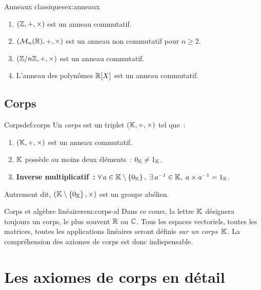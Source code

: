 \begin{example}{Anneaux classiques}{ex:anneaux}
  \begin{enumerate}[label=(\alph*)]
    \item $({\mathbb{Z}},+,\times)$ est un anneau commutatif.
    \item $(\mathcal{M}_n({\mathbb{R}}),+,\times)$ est un anneau non commutatif pour $n\geq 2$.
    \item $({\mathbb{Z}}/n{\mathbb{Z}},+,\times)$ est un anneau commutatif.
    \item L'anneau des polynômes ${\mathbb{R}}[X]$ est un anneau commutatif.
  \end{enumerate}
\end{example}

\subsection{Corps}\label{subsec:corps}

\begin{definition}{Corps}{def:corps}
  Un \emph{corps} est un triplet $({\mathbb{K}},+,\times)$ tel que~:
  \begin{enumerate}[label=\textbf{(C\arabic*)}]
    \item $({\mathbb{K}},+,\times)$ est un anneau commutatif.
    \item ${\mathbb{K}}$ possède au moins deux éléments~: $0_{\mathbb{K}}\neq 1_{\mathbb{K}}$.
    \item \textbf{Inverse multiplicatif~:} $\forall\, a\in{\mathbb{K}}\setminus\left\{0_{\mathbb{K}}\right\},\;
      \exists\, a^{-1}\in{\mathbb{K}},\; a\times a^{-1}=1_{\mathbb{K}}$.
  \end{enumerate}
  Autrement dit, $({\mathbb{K}}\setminus\left\{0_{\mathbb{K}}\right\},\times)$ est un groupe abélien.
\end{definition}

\begin{remark}{Corps et algèbre linéaire}{rem:corps-al}
  Dans ce cours, la lettre ${\mathbb{K}}$ désignera toujours un corps, le plus
  souvent ${\mathbb{R}}$ ou ${\mathbb{C}}$. Tous les espaces vectoriels, toutes les matrices,
  toutes les applications linéaires seront définis \emph{sur un corps}~${\mathbb{K}}$.
  La compréhension des axiomes de corps est donc indispensable.
\end{remark}

\section{Les axiomes de corps en détail}\label{sec:axiomes-corps}

